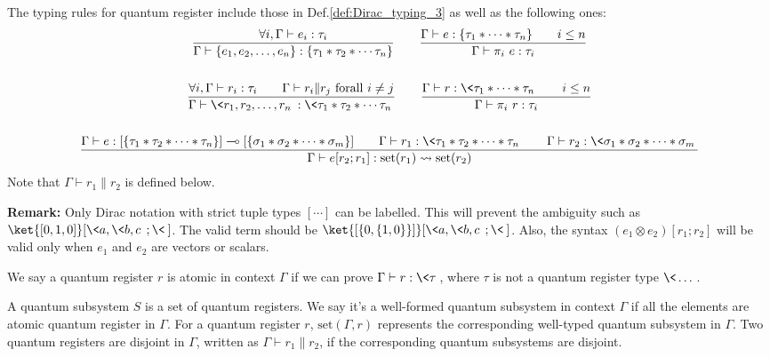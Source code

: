 \begin{definition}
  The typing rules for quantum register include those in Def.\ref{def:Dirac_typing_3} as well as the following ones:
  \begin{gather*}
    \frac{\forall i, \Gamma \vdash e_i : \tau_i}{\Gamma \vdash \{e_1, e_2, \dots, e_n\} : \{\tau_1 * \tau_2 * \cdots \tau_n \} }
    \qquad 
    \frac{\Gamma \vdash e : \{ \tau_1 * \cdots * \tau_n \} \qquad i \leq n}{\Gamma \vdash \pi_i\ e : \tau_i}\\
    \ \\
    \frac{\forall i, \Gamma \vdash r_i : \tau_i \qquad \Gamma \vdash r_i \| r_j\ \mathrm{for all}\ i \neq j}{\Gamma \vdash \<r_1, r_2, \dots, r_n\> : \<\tau_1 * \tau_2 * \cdots \tau_n \> }
    \qquad 
    \frac{\Gamma \vdash r : \< \tau_1 * \cdots * \tau_n \> \qquad i \leq n}{\Gamma \vdash \pi_i\ r : \tau_i}\\
    \ \\
    \frac{\Gamma \vdash e : [\{\tau_1 * \tau_2 * \cdots * \tau_n\}] \multimap [\{\sigma_1 * \sigma_2 * \cdots * \sigma_m\}] \qquad \Gamma \vdash r_1 : \<\tau_1 * \tau_2 * \cdots * \tau_n\> \qquad \Gamma \vdash r_2 : \<\sigma_1 * \sigma_2 * \cdots * \sigma_m\>}{\Gamma \vdash e[r_2 ; r_1] : \mathrm{set}(r_1)\rightsquigarrow \mathrm{set}(r_2)}
  \end{gather*}
  Note that $\Gamma \vdash r_1 \| r_2$ is defined below.
\end{definition}

\textbf{Remark:} Only Dirac notation with strict tuple types $[{\cdots}]$ can be labelled. This will prevent the ambiguity such as $\ket{[0, 1, 0]}[\<a, \<b, c\>\>; \<\>]$. The valid term should be $\ket{[\{0, \{1, 0\}\}]}[\<a, \<b, c\>\>; \<\>]$. Also, the syntax $(e_1 \otimes e_2)[r_1; r_2]$ will be valid only when $e_1$ and $e_2$ are vectors or scalars.


\begin{definition}
  We say a quantum register $r$ is atomic in context $\Gamma$ if we can prove
  $\Gamma \vdash r : \<\tau\>$, where $\tau$ is not a quantum register type $\<\dots\>$.
\end{definition}

\begin{definition}
  A quantum subsystem $S$ is a set of quantum registers. 
  We say it's a well-formed quantum subsystem in context $\Gamma$ if all the elements are atomic quantum register in $\Gamma$. 
  For a quantum register $r$, $\mathrm{set}(\Gamma, r)$ represents the corresponding well-typed quantum subsystem in $\Gamma$.
  Two quantum registers are disjoint in $\Gamma$, written as $\Gamma \vdash r_1 \| r_2$, if the corresponding quantum subsystems are disjoint.
\end{definition}


